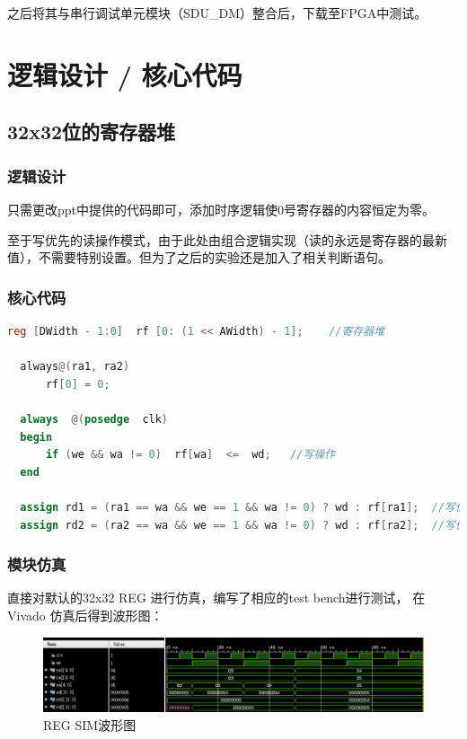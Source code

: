 \documentclass[a4paper]{article}
\begin{document}
之后将其与串行调试单元模块（SDU\_DM）整合后，下载至FPGA中测试。

\section{逻辑设计 / 核心代码}
\subsection{32x32位的寄存器堆}
\subsubsection{逻辑设计}
只需更改ppt中提供的代码即可，添加时序逻辑使0号寄存器的内容恒定为零。

至于写优先的读操作模式，由于此处由组合逻辑实现（读的永远是寄存器的最新值），不需要特别设置。但为了之后的实验还是加入了相关判断语句。
\subsubsection{核心代码}
\begin{lstlisting}[language={verilog},title={reg.v}] 
  reg [DWidth - 1:0]  rf [0: (1 << AWidth) - 1]; 	//寄存器堆

  always@(ra1, ra2)
      rf[0] = 0;
  
  always  @(posedge  clk)
  begin
      if (we && wa != 0)  rf[wa]  <=  wd;   //写操作
  end
  
  assign rd1 = (ra1 == wa && we == 1 && wa != 0) ? wd : rf[ra1];  //写优先的读操作1
  assign rd2 = (ra2 == wa && we == 1 && wa != 0) ? wd : rf[ra2];  //写优先的读操作2
\end{lstlisting}

\subsubsection{模块仿真}
直接对默认的32x32 REG 进行仿真，编写了相应的test bench进行测试，
在 Vivado 仿真后得到波形图：
\begin{figure}[H]
    \centering
    \includegraphics[width=1.0\textwidth]{reg_sim.png}
    \caption{REG SIM波形图}
    \label{fig:reg_sim}
  \end{figure}
\end{document}
